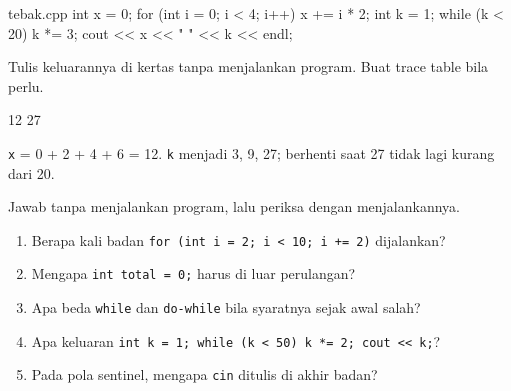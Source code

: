 \documentclass[a4paper]{article}
\begin{document}
\begin{MKode}{tebak.cpp}
int x = 0;
for (int i = 0; i < 4; i++) {
    x += i * 2;
}
int k = 1;
while (k < 20) {
    k *= 3;
}
cout << x << " " << k << endl;
\end{MKode}
\begin{Tebak}[]
Tulis keluarannya di kertas tanpa menjalankan program. Buat trace table bila perlu.
\end{Tebak}
\begin{Jawaban}[]
\begin{MKeluaran}[]
12 27
\end{MKeluaran}
\texttt{x} = 0 + 2 + 4 + 6 = 12. \texttt{k} menjadi 3, 9, 27; berhenti saat 27 tidak lagi kurang dari 20.
\end{Jawaban}
\par\vspace{4pt}\par\vspace{6pt}
Jawab tanpa menjalankan program, lalu periksa dengan menjalankannya.
\begin{enumerate}
\item Berapa kali badan \texttt{for (int i = 2; i < 10; i += 2)} dijalankan?
\item Mengapa \texttt{int total = 0;} harus di luar perulangan?
\item Apa beda \texttt{while} dan \texttt{do-while} bila syaratnya sejak awal salah?
\item Apa keluaran \texttt{int k = 1; while (k < 50) k *= 2; cout << k;}?
\item Pada pola sentinel, mengapa \texttt{cin} ditulis di akhir badan?
\end{enumerate}
\end{document}
